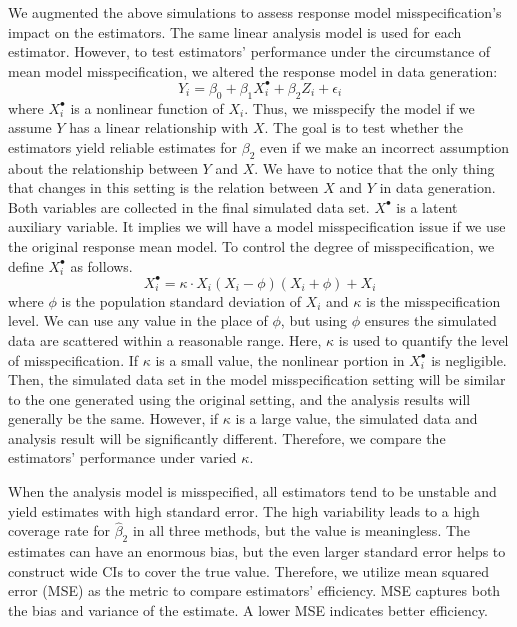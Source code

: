 \documentclass[
  12pt,
]{article}
\begin{document}
We augmented the above simulations to assess response model
misspecification's impact on the estimators. The same linear analysis
model is used for each estimator. However, to test estimators'
performance under the circumstance of mean model misspecification, we
altered the response model in data generation: \[
Y_i = \beta_0 + \beta_1 X_i^{\bullet} + \beta_2 Z_i + \epsilon_i
\] where \(X_i^{\bullet}\) is a nonlinear function of \(X_i\). Thus, we
misspecify the model if we assume \(Y\) has a linear relationship with
\(X\). The goal is to test whether the estimators yield reliable
estimates for \(\beta_2\) even if we make an incorrect assumption about
the relationship between \(Y\) and \(X\). We have to notice that the
only thing that changes in this setting is the relation between \(X\)
and \(Y\) in data generation. Both variables are collected in the final
simulated data set. \(X^{\bullet}\) is a latent auxiliary variable. It
implies we will have a model misspecification issue if we use the
original response mean model. To control the degree of misspecification,
we define \(X_i^{\bullet}\) as follows. \[
X_i^{\bullet} = \kappa \cdot X_i(X_i - \phi)(X_i + \phi) + X_i
\] where \(\phi\) is the population standard deviation of \(X_i\) and
\(\kappa\) is the misspecification level. We can use any value in the
place of \(\phi\), but using \(\phi\) ensures the simulated data are
scattered within a reasonable range. Here, \(\kappa\) is used to
quantify the level of misspecification. If \(\kappa\) is a small value,
the nonlinear portion in \(X_i^{\bullet}\) is negligible. Then, the
simulated data set in the model misspecification setting will be similar
to the one generated using the original setting, and the analysis
results will generally be the same. However, if \(\kappa\) is a large
value, the simulated data and analysis result will be significantly
different. Therefore, we compare the estimators' performance under
varied \(\kappa\).

When the analysis model is misspecified, all estimators tend to be
unstable and yield estimates with high standard error. The high
variability leads to a high coverage rate for \(\hat\beta_2\) in all
three methods, but the value is meaningless. The estimates can have an
enormous bias, but the even larger standard error helps to construct
wide CIs to cover the true value. Therefore, we utilize mean squared
error (MSE) as the metric to compare estimators' efficiency. MSE
captures both the bias and variance of the estimate. A lower MSE
indicates better efficiency.
\end{document}
